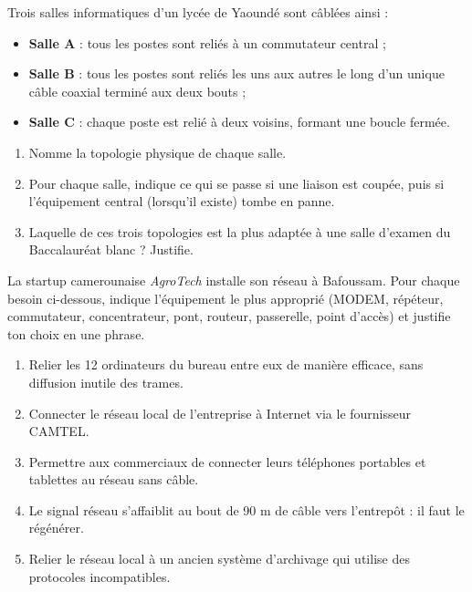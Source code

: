 \documentclass[11pt]{article}
\begin{document}
\begin{exercice}
Trois salles informatiques d'un lycée de Yaoundé sont câblées ainsi :
\begin{itemize}
  \item \textbf{Salle A} : tous les postes sont reliés à un commutateur central ;
  \item \textbf{Salle B} : tous les postes sont reliés les uns aux autres le long d'un unique câble coaxial terminé aux deux bouts ;
  \item \textbf{Salle C} : chaque poste est relié à deux voisins, formant une boucle fermée.
\end{itemize}
\begin{enumerate}
  \item Nomme la topologie physique de chaque salle.
  \item Pour chaque salle, indique ce qui se passe si une liaison est coupée, puis si l'équipement central (lorsqu'il existe) tombe en panne.
  \item Laquelle de ces trois topologies est la plus adaptée à une salle d'examen du Baccalauréat blanc ? Justifie.
\end{enumerate}
\end{exercice}

\begin{exercice}
La startup camerounaise \emph{AgroTech} installe son réseau à Bafoussam. Pour chaque besoin ci-dessous, indique l'équipement le plus approprié (MODEM, répéteur, commutateur, concentrateur, pont, routeur, passerelle, point d'accès) et justifie ton choix en une phrase.
\begin{enumerate}
  \item Relier les 12 ordinateurs du bureau entre eux de manière efficace, sans diffusion inutile des trames.
  \item Connecter le réseau local de l'entreprise à Internet via le fournisseur CAMTEL.
  \item Permettre aux commerciaux de connecter leurs téléphones portables et tablettes au réseau sans câble.
  \item Le signal réseau s'affaiblit au bout de 90 m de câble vers l'entrepôt : il faut le régénérer.
  \item Relier le réseau local à un ancien système d'archivage qui utilise des protocoles incompatibles.
\end{enumerate}
\end{exercice}
\end{document}
